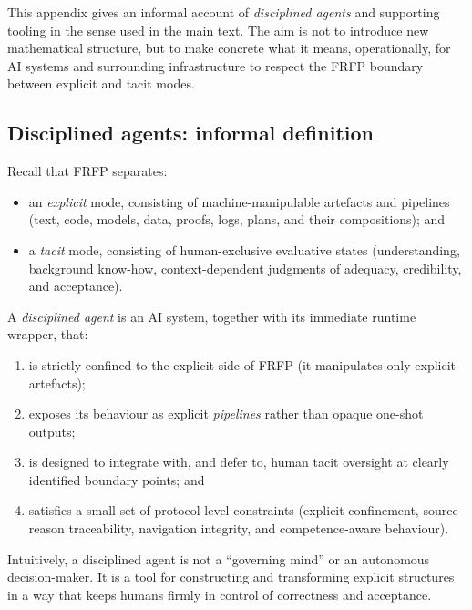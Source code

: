 
This appendix gives an informal account of \emph{disciplined agents} and supporting tooling in the sense used in the main text. The aim is not to introduce new mathematical structure, but to make concrete what it means, operationally, for AI systems and surrounding infrastructure to respect the FRFP boundary between explicit and tacit modes.

\subsection{Disciplined agents: informal definition}

Recall that FRFP separates:
\begin{itemize}
  \item an \emph{explicit} mode, consisting of machine-manipulable artefacts and pipelines (text, code, models, data, proofs, logs, plans, and their compositions); and
  \item a \emph{tacit} mode, consisting of human-exclusive evaluative states (understanding, background know-how, context-dependent judgments of adequacy, credibility, and acceptance).
\end{itemize}

\begin{definition}
A \emph{disciplined agent} is an AI system, together with its immediate runtime wrapper, that:
\begin{enumerate}
  \item is strictly confined to the explicit side of FRFP (it manipulates only explicit artefacts);
  \item exposes its behaviour as explicit \emph{pipelines} rather than opaque one-shot outputs;
  \item is designed to integrate with, and defer to, human tacit oversight at clearly identified boundary points; and
  \item satisfies a small set of protocol-level constraints (explicit confinement, source--reason traceability, navigation integrity, and competence-aware behaviour).
\end{enumerate}
\end{definition}

Intuitively, a disciplined agent is not a ``governing mind'' or an autonomous decision-maker. It is a tool for constructing and transforming explicit structures in a way that keeps humans firmly in control of correctness and acceptance.

